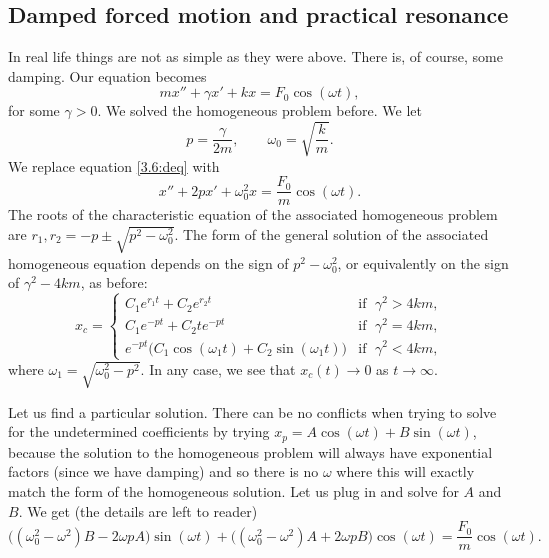 \documentclass{ximera}
\begin{document}
\subsection{Damped forced motion and practical resonance}

In real life things are not as simple as they were above.  There is, of course, some damping.  Our equation becomes
\begin{equation} \label{3.6:deq}
    mx'' + \gamma x' + kx = F_0 \cos (\omega t) ,
\end{equation}
for some $\gamma > 0$.  We solved the homogeneous problem before.  We let
\begin{equation*}
    p = \frac{\gamma}{2m},  \qquad \omega_0 = \sqrt{\frac{k}{m}} .
\end{equation*}
We replace equation \eqref{3.6:deq} with
\begin{equation*}
    x'' + 2px' + \omega_0^2x = \frac{F_0}{m} \cos (\omega t) .
\end{equation*}
The roots of the characteristic equation of the associated homogeneous problem are $r_1,r_2 = -p \pm \sqrt{p^2 - \omega_0^2}$.  The form of the general solution of the associated homogeneous equation depends on the sign of $p^2 - \omega_0^2$, or equivalently on the sign of $\gamma^2 - 4km$, as before:
\begin{equation*}
    x_c =
    \begin{cases}
        C_1 e^{r_1 t} + C_2 e^{r_2 t} & \text{if } \; \gamma^2 > 4km , \\
        C_1 e^{-p t} + C_2 t e^{-p t} & \text{if } \; \gamma^2 = 4km , \\
        e^{-p t} \bigl( C_1 \cos (\omega_1 t) + C_2 \sin (\omega_1 t) \bigr) & \text{if } \; \gamma^2 < 4km ,
    \end{cases}
\end{equation*}
where $\omega_1 = \sqrt{\omega_0^2 - p^2}$.  In any case, we see that $x_c(t) \to 0$ as $t \to \infty$.


Let us find a particular solution. There can be no conflicts when trying to solve for the undetermined coefficients by trying $x_p = A \cos (\omega t) + B \sin (\omega t)$, because the solution to the homogeneous problem will always have exponential factors (since we have damping) and so there is no $\omega$ where this will exactly match the form of the homogeneous solution.
Let us plug in and solve for $A$ and $B$. We get (the  %
details are left to reader)
\begin{equation*}
    \bigl((\omega_0^2  - \omega^2)B - 2\omega p A\bigr) \sin (\omega t) + \bigl((\omega_0^2  - \omega^2)A + 2\omega p B\bigr) \cos (\omega t) = \frac{F_0}{m} \cos (\omega t) .
\end{equation*}
\end{document}
